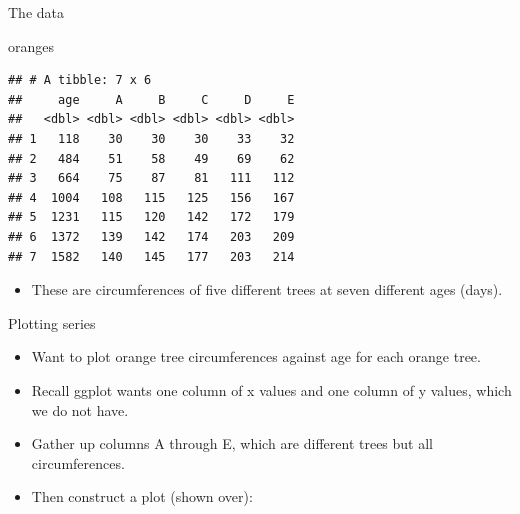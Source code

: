 \documentclass[ignorenonframetext,]{beamer}
\newenvironment{Shaded}{\begin{snugshade}}{\end{snugshade}}
\newcommand{\DataTypeTok}[1]{\textcolor[rgb]{0.13,0.29,0.53}{#1}}
\newcommand{\KeywordTok}[1]{\textcolor[rgb]{0.13,0.29,0.53}{\textbf{#1}}}
\newcommand{\NormalTok}[1]{#1}
\newcommand{\OperatorTok}[1]{\textcolor[rgb]{0.81,0.36,0.00}{\textbf{#1}}}
\newcommand{\StringTok}[1]{\textcolor[rgb]{0.31,0.60,0.02}{#1}}
\providecommand{\tightlist}{%
  \setlength{\itemsep}{0pt}\setlength{\parskip}{0pt}}
\begin{document}
\begin{frame}[fragile]{The data}
\protect\hypertarget{the-data-6}{}

\begin{Shaded}
\begin{Highlighting}[]
\NormalTok{oranges}
\end{Highlighting}
\end{Shaded}

\begin{verbatim}
## # A tibble: 7 x 6
##     age     A     B     C     D     E
##   <dbl> <dbl> <dbl> <dbl> <dbl> <dbl>
## 1   118    30    30    30    33    32
## 2   484    51    58    49    69    62
## 3   664    75    87    81   111   112
## 4  1004   108   115   125   156   167
## 5  1231   115   120   142   172   179
## 6  1372   139   142   174   203   209
## 7  1582   140   145   177   203   214
\end{verbatim}

\begin{itemize}
\tightlist
\item
  These are circumferences of five different trees at seven different
  ages (days).
\end{itemize}

\end{frame}

\begin{frame}[fragile]{Plotting series}
\protect\hypertarget{plotting-series}{}

\begin{itemize}
\item
  Want to plot orange tree circumferences against age for each orange
  tree.
\item
  Recall ggplot wants one column of x values and one column of y values,
  which we do not have.
\item
  Gather up columns A through E, which are different trees but all
  circumferences.
\item
  Then construct a plot (shown over):
\end{itemize}

\begin{Shaded}
\end{Shaded}

\end{frame}
\end{document}
